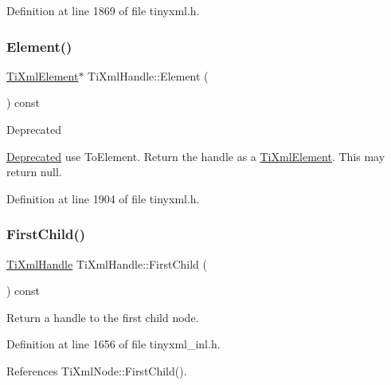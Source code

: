 Definition at line 1869 of file tinyxml.\+h.

\hypertarget{class_ti_xml_handle_ae9b22d71bf5f69ee5fda28f5ad21f19c}{}\label{class_ti_xml_handle_ae9b22d71bf5f69ee5fda28f5ad21f19c} 
\subsubsection{\texorpdfstring{Element()}{Element()}}
{\footnotesize\ttfamily \hyperlink{class_ti_xml_element}{Ti\+Xml\+Element}$\ast$ Ti\+Xml\+Handle\+::\+Element (\begin{DoxyParamCaption}{ }\end{DoxyParamCaption}) const\hspace{0.3cm}{\ttfamily [inline]}}

\begin{DoxyRefDesc}{Deprecated}
\item[\hyperlink{deprecated__deprecated000003}{Deprecated}]use To\+Element. Return the handle as a \hyperlink{class_ti_xml_element}{Ti\+Xml\+Element}. This may return null. \end{DoxyRefDesc}


Definition at line 1904 of file tinyxml.\+h.

\hypertarget{class_ti_xml_handle_afb1b4c0eda970b320dfd262304cc1d04}{}\label{class_ti_xml_handle_afb1b4c0eda970b320dfd262304cc1d04} 
\subsubsection{\texorpdfstring{First\+Child()}{FirstChild()}\hspace{0.1cm}{\footnotesize\ttfamily [1/3]}}
{\footnotesize\ttfamily \hyperlink{class_ti_xml_handle}{Ti\+Xml\+Handle} Ti\+Xml\+Handle\+::\+First\+Child (\begin{DoxyParamCaption}{ }\end{DoxyParamCaption}) const}



Return a handle to the first child node. 



Definition at line 1656 of file tinyxml\+\_\+inl.\+h.



References Ti\+Xml\+Node\+::\+First\+Child().

